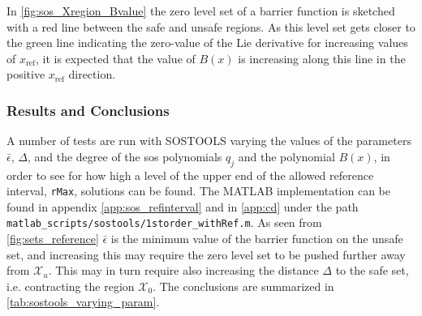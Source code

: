 In \autoref{fig:sos_Xregion_Bvalue} the zero level set of a barrier function is sketched with a red line between the safe and unsafe regions. As this level set gets  closer to the green line indicating the zero-value of the Lie derivative for increasing values of $x_\text{ref}$, it is expected that the value of  $B(x)$ is increasing along this line in the positive $x_\text{ref}$ direction.




\subsubsection{Results and Conclusions}

\vspace{-2mm}
A number of tests are run with SOSTOOLS varying the values of the parameters  $\bar{\epsilon}$, $\Delta$, and the degree of the \gls{sos} polynomials $q_j$ and the polynomial $B(x)$, %
in order to see for how high a level of the upper  end  of the allowed reference interval, \texttt{rMax}, solutions can be found. The MATLAB implementation can be found in appendix \ref{app:sos_refinterval} and in \autoref{app:cd} under the path \texttt{matlab\_scripts/sostools/1storder\_withRef.m}.
As seen from \autoref{fig:sets_reference} $\bar{\epsilon}$ is the minimum value of the barrier function on the unsafe set, and increasing this may require the zero level set to be pushed further away from $\mathcal{X}_u$. This may in turn require also increasing the distance $\Delta$ to the safe set, i.e. contracting the region $\mathcal{X}_0$.
The conclusions are summarized in \autoref{tab:sostools_varying_param}.


